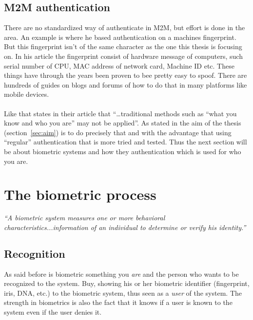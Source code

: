 \subsection{M2M authentication}
There are no standardized way of authenticate in M2M, but effort is done in the area. An example is \cite[]{auth:M2M} where he based authentication on a machines fingerprint. But this fingerprint isn't of the same character as the one this thesis is focusing on. In his article the fingerprint consist of hardware message of computers, such serial number of CPU, MAC address of network card, Machine ID etc. These things have through the years been proven to bee pretty easy to spoof. There are hundreds of guides on blogs and forums of how to do that in many platforms like mobile devices. \\
\\
Like \cite[]{auth:M2Mcom} that states in their article that ``\dots traditional methods such as “what you know and who you are” may not be applied''. As stated in the aim of the thesis  (section~\ref{sec:aim}) is to do precisely that and with the advantage that using ``regular'' authentication that is more  tried and tested. Thus the next section will be about biometric systems and how they authentication which is used for who you are.


\section{The biometric process}\label{sec:biometric}
\begin{center}\textit{``A biometric system measures one or more behavioral characteristics...information of an individual to determine or verify his identity.''} \cite[p.~3]{introbio}\end{center}

\subsection{Recognition}
As said before is biometric something you \textit{are} and the person who wants to be recognized to the system. Buy, showing his or her biometric identifier (fingerprint, iris, DNA, etc.) to the biometric system, thus seen as a \textit{user} of the system. The strength in biometrics is also the fact that it knows if a user is known to the system even if the user denies it. \cite[ch.~1]{introbio}

